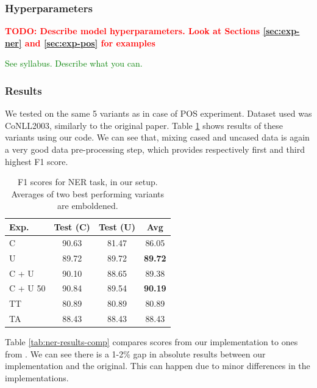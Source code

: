 \documentclass[11pt,a4paper]{article}
\begin{document}
    \subsubsection{Hyperparameters}
    \textbf{\textcolor{red}{TODO: Describe model hyperparameters. Look at Sections \ref{sec:exp-ner} and \ref{sec:exp-pos} for examples}}

    \textcolor{green}{See syllabus. Describe what you can.}

    \subsubsection{Results}
    We tested on the same 5 variants as in case of POS experiment. Dataset used was CoNLL2003, similarly to the original paper. Table \ref{tab:ner-results-our} shows results of these variants using our code. We can see that, mixing cased and uncased data is again a very good data pre-processing step, which provides respectively first and third highest F1 score.

    \begin{table}[h]
        \centering
        \begin{tabular}{|l|c|c|c|}
            \hline
            Exp. & Test (C) & Test (U) & Avg \\
            \hline
            C        & 90.63 & 81.47 & 86.05 \\
            U        & 89.72 & 89.72 & \textbf{89.72} \\
            C + U    & 90.10 & 88.65 & 89.38 \\
            C + U 50 & 90.84 & 89.54 & \textbf{90.19} \\
            TT       & 80.89 & 80.89 & 80.89 \\
            TA       & 88.43 & 88.43 & 88.43 \\
            \hline
        \end{tabular}
        \caption{F1 scores for NER task, in our setup. Averages of two best performing variants are emboldened.}
        \label{tab:ner-results-our}
    \end{table}

    Table \ref{tab:ner-results-comp} compares scores from our implementation to ones from \cite{ner-and-pos-original}. We can see there is a 1-2\% gap in absolute results between our implementation and the original. This can happen due to minor differences in the implementations.
\end{document}
